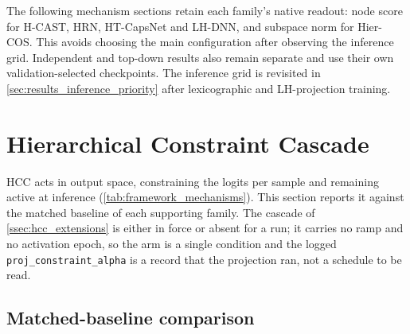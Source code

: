 The following mechanism sections retain each family's native readout: node score
for H-CAST, HRN, HT-CapsNet and LH-DNN, and subspace norm for Hier-COS. This
avoids choosing the main configuration after observing the inference grid. Independent and top-down
results also remain separate and use their own validation-selected checkpoints.
The inference grid is revisited in \cref{sec:results_inference_priority} after
lexicographic and LH-projection training.

\FloatBarrier

\section{Hierarchical Constraint Cascade}
\label{sec:results_hcc}

HCC acts in output space, constraining the logits per sample and remaining active at inference
(\cref{tab:framework_mechanisms}). This section reports it against the
matched baseline of each supporting family. The cascade of
\cref{ssec:hcc_extensions} is either in force or absent for a run; it carries
no ramp and no activation epoch, so the arm is a single condition and the logged
\texttt{proj\_constraint\_alpha} is a record that the projection ran, not a
schedule to be read.

\subsection{Matched-baseline comparison}
\label{ssec:results_hcc_main}



